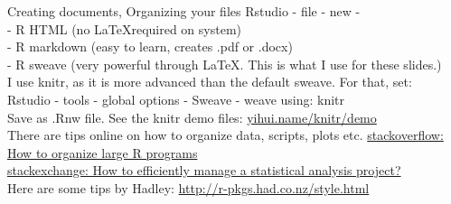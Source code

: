\documentclass[xcolor=table,       handout,    xcolor=dvipsnames]{beamer}\usepackage[]{graphicx}\usepackage[]{color}
\begin{document}

\begin{frame}{Creating documents, Organizing your files}
\label{rnw}
Rstudio - file - new -\\
- R HTML (no \LaTeX required on system)\\
- R markdown (easy to learn, creates .pdf or .docx)\\
- R sweave (very powerful through \LaTeX. This is what I use for these slides.)\\[1em]
\pause
I use knitr, as it is more advanced than the default sweave. For that, set:\\
Rstudio - tools - global options - Sweave - weave using: knitr\\
Save as .Rnw file. See the knitr demo files: \href{http://yihui.name/knitr/demo/minimal/}{yihui.name/knitr/demo}\\[1em]
\pause
There are tips online on how to organize data, scripts, plots etc.
\href{http://stackoverflow.com/questions/1266279/how-to-organize-large-r-programs}{stackoverflow: How to organize large R programs}\\
\href{http://stats.stackexchange.com/questions/2910/how-to-efficiently-manage-a-statistical-analysis-project}
{stackexchange: How to efficiently manage a statistical analysis project?}\\
Here are some tips by Hadley:
\href{http://r-pkgs.had.co.nz/style.html}{http://r-pkgs.had.co.nz/style.html}
\end{frame}


\end{document}
